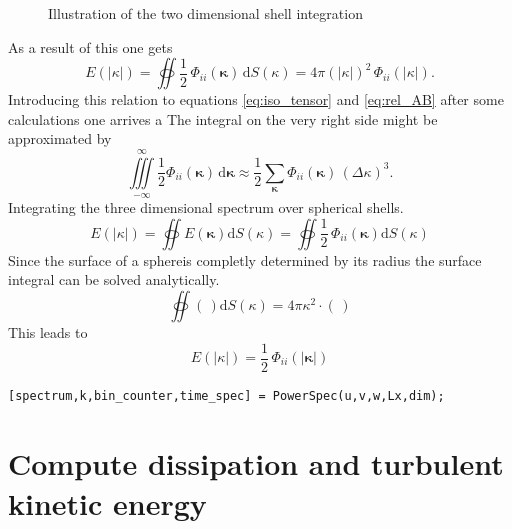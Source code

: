 \documentclass[preprint,12pt,ntfdMod]{elsarticle}
\begin{document}
\begin{par}
\begin{figure}
      \caption{Illustration of the two dimensional shell integration}
      \label{fig:shell_int}
  \end{figure}
As a result of this one gets
  \begin{equation}
      E(|\kappa|)=\oiint\frac{1}{2}\,\Phi_{ii}(\boldsymbol\kappa)\,\mathrm{d}S(\kappa)
      =4\pi(|\kappa|)^2\,\Phi_{ii}(|\kappa|).
  \end{equation}
Introducing this relation to equations \eqref{eq:iso_tensor} and
\eqref{eq:rel_AB} after some calculations one arrives a
The integral on the very right side might be approximated by
  \begin{equation}
      \iiint\limits_{-\infty}^{\infty}\frac{1}{2}\Phi_{ii}(\boldsymbol\kappa)\,\mathrm{d}\boldsymbol\kappa
      \approx\frac{1}{2}\sum\limits_{\boldsymbol\kappa}\Phi_{ii}(\boldsymbol\kappa)\,(\Delta\kappa)^3.
  \end{equation}
Integrating the three dimensional spectrum over spherical shells.
  \begin{equation}
      E(|\kappa|) = \oiint E(\boldsymbol\kappa)\mathrm{d}S(\kappa)
                = \oiint \frac{1}{2}\,\Phi_{ii}(\boldsymbol\kappa)\mathrm{d}S(\kappa)
  \end{equation}
  Since the surface of a sphereis completly determined by its radius the
  surface integral can be solved analytically.
  \begin{equation}
      \oiint(\,)\mathrm{d}S(\kappa) = 4\pi\kappa^2\cdot(\,)
  \end{equation}
This leads to
  \begin{equation}
      E(|\kappa|) = \frac{1}{2}\,\Phi_{ii}(|\boldsymbol\kappa|)
  \end{equation}

\end{par} \vspace{1em}
\begin{lstlisting}
[spectrum,k,bin_counter,time_spec] = PowerSpec(u,v,w,Lx,dim);
\end{lstlisting}
\begin{par}



\end{par} \vspace{1em}


\section{Compute dissipation and turbulent kinetic energy}
\end{document}
